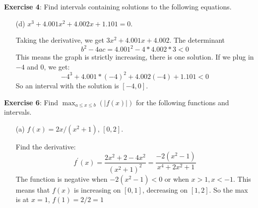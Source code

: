 \documentclass{article}
\begin{document}
\textbf{Exercise 4}:
    Find intervals containing solutions to the following equations.
    \begin{itemize}
        \item [(d)] $x^3 + 4.001x^2 + 4.002x + 1.101 = 0$.
        \begin{answer}
            Taking the derivative, we get $3x^2 + 4.001x + 4.002$. The determinant
                \begin{equation*}
                    b^{2} - 4ac = 4.001^{2} - 4 * 4.002 * 3 < 0
                \end{equation*}
            This means the graph is strictly increasing, there is one solution. If we plug in $-4$ and $0$, we get:
                \begin{equation*}
                    -4^{3} + 4.001 * (-4)^{2} + 4.002(-4) + 1.101 < 0
                \end{equation*}
            So an interval with the solution is $[-4, 0]$.
        \end{answer}
    \end{itemize}

\textbf{Exercise 6}:
    Find $\max_{a \leq x \leq b}(\lvert f(x) \rvert)$ for the following functions and intervals.
    \begin{itemize}
        \item [(a)] $f(x) = 2x / (x^{2} + 1), \, [0, 2]$.
            \begin{answer}
                Find the derivative:
                    \begin{equation*}
                        f^{\prime}(x) = \dfrac{2x^{2} + 2 - 4x^{2}}{(x^{2} + 1)^{2}} = \dfrac{-2(x^{2} - 1)}{x^{4} + 2x^{2} + 1}
                    \end{equation*}
                The function is negative when $-2(x^{2} - 1) < 0$ or when $x > 1, x < -1$. This means that $f(x)$ is increasing on $[0, 1]$, decreasing on $[1, 2]$. So the max is at $x = 1$, $f(1) = 2 / 2 = 1$
            \end{answer}
    \end{itemize}
\end{document}
